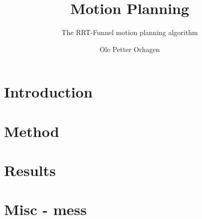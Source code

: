 \documentclass[a4paper, oneside, final]{memoir} %
\title{Motion Planning}
\author{Ole Petter Orhagen}
\subtitle{The RRT-Funnel motion planning algorithm}
\begin{document}
    \mnfrontpage{}
    \frontmatter        %
    
    
    
    
    \cleartorecto{}
    \tableofcontents    %
    \cleartorecto{}
    \listoffigures      %
    \cleartorecto{}
    \listoftables       %
    \mainmatter{}       %
    \part{Introduction}
    
    
    
    
    
    \part{Method}
    
    \part{Results}
    
    
    
    \part{Misc - mess}
    \appendix           %
    \appendixpage       %
    
    
    \backmatter         %
    \printbibliography
\end{document}

